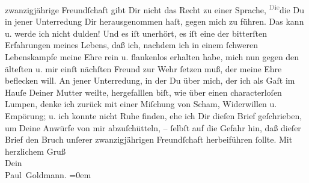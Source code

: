 \begin{ledgroupsized}[t]{13cm}
               zwanzigjährige Freundſchaft gibt Dir nicht das Recht zu einer Sprache, \substVorne{}\textsuperscript{\textcolor{gray}{D}i\textcolor{gray}{e}}\substDazwischen{}die\substHinten{} Du in jener Unterredung Dir herausgenommen haſt, gegen mich zu führen. Das
               kann u. werde ich nicht {\pb}dulden! Und es iſt  unerhört, es iſt eine der bitterſten Erfahrungen
               meines Lebens, daß ich, nachdem ich in einem ſchweren Lebenskampfe meine Ehre rein u.
               flankenlos erhalten habe, mich nun gegen den älteſten u. mir einſt nächſten Freund
               zur Wehr ſetzen  muß, der meine Ehre \strikeout{\textcolor{gray}{bef}} beflecken will. An jener Unterredung, in der  Du über mich, der ich als Gaſt im Hauſe Deiner Mutter weilte, {\pb}\strikeout{\textcolor{gray}{×}\-\textcolor{gray}{×}\-\textcolor{gray}{×}\-\textcolor{gray}{×}\-\textcolor{gray}{×}\-\textcolor{gray}{×}\-\textcolor{gray}{×}} hergefalllen biſt, wie über einen characterloſen Lumpen, denke ich zurück mit
               einer Miſchung von Scham, Widerwillen u. Empörung; u. ich konnte nicht Ruhe finden,
               ehe ich Dir dieſen Brief geſchrieben, um Deine Anwürfe von mir abzuſchütteln, –
               ſelbſt auf die Gefahr hin, daß dieſer Brief den Bruch unſerer zwanzigjährigen
               Freundſchaft herbeiführen ſollte.\pend
           \pstart
           {\pb}Mit herzlichem Gruß {\\[\baselineskip]}Dein {\\[\baselineskip]}\spacefill\mbox{Paul Goldmann.}\pend
           \leftskip=0em{}
         
         \endnumbering{}\end{ledgroupsized}\begin{anhang}\end{anhang}\newcommand{\dateiname}{L03475}\newcommand{\titel}{Paul Goldmann an Arthur Schnitzler, 13. 1. 1911}\newcommand{\editorInnen}{Martin Anton Müller und Laura Untner}
      